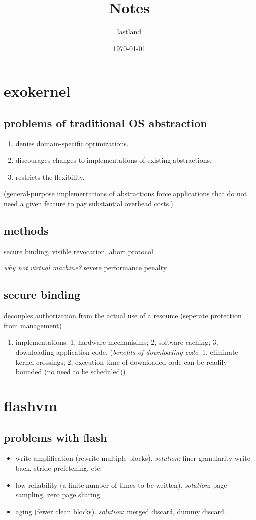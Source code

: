 \documentclass[9pt,conference]{IEEEtran}
\author{lastland}
\date{\today}
\title{Notes}
\begin{document}
\section{exokernel}
\label{sec-1}
\subsection{problems of traditional OS abstraction}
\label{sec-1-1}
\begin{enumerate}
\item denies domain-specific optimizations.
\item discourages changes to implementations of existing abstractions.
\item restricts the flexibility.
\end{enumerate}
(general-purpose implementations of abstractions force applications that do not need a given feature to pay substantial overhead costs.)
\subsection{methods}
\label{sec-1-2}
secure binding, visible revocation, abort protocol

\emph{why not virtual machine?} severe performance penalty
\subsection{secure binding}
\label{sec-1-3}
decouples authorization from the actual use of a resource (seperate protection from management)
\begin{enumerate}
\item implementations:
\label{sec-1-3-1}
1, hardware mechanisims; 2, software caching; 3, downloading application code.
(\emph{benefits of downloading code}: 1, eliminate kernel crossings;
2, execution time of downloaded code can be readily bounded (no need to be scheduled))
\end{enumerate}
\section{flashvm}
\label{sec-2}
\subsection{problems with flash}
\label{sec-2-1}
\begin{itemize}
\item write amplification (rewrite multiple blocks). \emph{solution}: finer granularity write-back, stride prefetching, etc.
\item low reliability (a finite number of times to be written). \emph{solution}: page sampling, zero page sharing.
\item aging (fewer clean blocks). \emph{solution}: merged discard, dummy discard.
\end{itemize}
\end{document}
